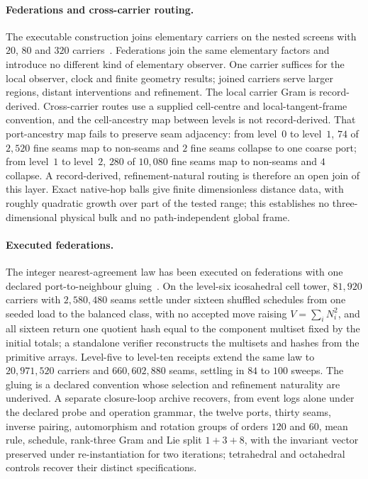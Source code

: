 \documentclass[11pt]{article}
\theoremstyle{remark}
\theoremstyle{plain}
\begin{document}
\paragraph{Federations and cross-carrier routing.}
The executable construction joins elementary carriers on the nested screens
with \(20\), \(80\) and \(320\) carriers~\cite{ophmodel}. Federations join the
same elementary factors and introduce no different kind of elementary
observer. One carrier suffices for the local observer, clock and finite
geometry results; joined carriers serve larger regions, distant
interventions and refinement. The local carrier Gram is record-derived.
Cross-carrier routes use a supplied cell-centre and local-tangent-frame
convention, and the cell-ancestry map between levels is not record-derived.
That port-ancestry map fails to preserve seam adjacency: from level~\(0\) to
level~\(1\), \(74\) of \(2{,}520\) fine seams map to non-seams and \(2\) fine
seams collapse to one coarse port; from level~\(1\) to level~\(2\), \(280\)
of \(10{,}080\) fine seams map to non-seams and \(4\) collapse. A
record-derived, refinement-natural routing is therefore an open join of this
layer. Exact native-hop balls give finite dimensionless distance data, with
roughly quadratic growth over part of the tested range; this establishes no
three-dimensional physical bulk and no path-independent global frame.

\paragraph{Executed federations.}
The integer nearest-agreement law has been executed on federations with one
declared port-to-neighbour gluing~\cite{ophfpe}. On the level-six
icosahedral cell tower, \(81{,}920\) carriers with \(2{,}580{,}480\) seams
settle under sixteen shuffled schedules from one seeded load to the balanced
class, with no accepted move raising \(V=\sum_iN_i^2\), and all sixteen
return one quotient hash equal to the component multiset fixed by the initial
totals; a standalone verifier reconstructs the multisets and hashes from the
primitive arrays. Level-five to level-ten receipts extend the same law to
\(20{,}971{,}520\) carriers and \(660{,}602{,}880\) seams, settling in \(84\)
to \(100\) sweeps. The gluing is a declared convention whose selection and
refinement naturality are underived. A separate closure-loop archive
recovers, from event logs alone under the declared probe and operation
grammar, the twelve ports, thirty seams, inverse pairing, automorphism and
rotation groups of orders \(120\) and \(60\), mean rule, schedule, rank-three
Gram and Lie split \(1+3+8\), with the invariant vector preserved under
re-instantiation for two iterations; tetrahedral and octahedral controls
recover their distinct specifications.
\end{document}
